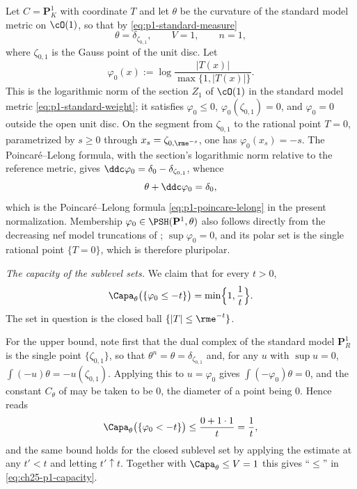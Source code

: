 \begin{example}
\label{ex:ch25-pluripolar-computed}
Let $C=\mathbf P^1_K$ with coordinate $T$ and let $\theta$ be the
curvature of the standard model metric on $\cO(1)$, so that by
\eqref{eq:p1-standard-measure}
\[
 \theta=\delta_{\zeta_{0,1}},\qquad V=1,\qquad n=1,
\]
where $\zeta_{0,1}$ is the Gauss point of the unit disc.  Let
\[
 \varphi_0(x):=\log\frac{|T(x)|}{\max\{1,|T(x)|\}} .
\]
This is the logarithmic norm of the section $Z_1$ of $\cO(1)$ in the standard model
metric \eqref{eq:p1-standard-weight}; it satisfies $\varphi_0\leq0$,
$\varphi_0(\zeta_{0,1})=0$, and $\varphi_0=0$ outside the open unit disc.
On the segment from $\zeta_{0,1}$ to the rational point $T=0$,
parametrized by $s\geq0$ through $x_s=\zeta_{0,\rme^{-s}}$, one has
$\varphi_0(x_s)=-s$.  The Poincar\'e--Lelong formula, with the section's
logarithmic norm relative to the reference metric, gives
$\ddc\varphi_0=\delta_0-\delta_{\zeta_{0,1}}$, whence
\[
 \theta+\ddc\varphi_0=\delta_0,
\]
which is the Poincar\'e--Lelong formula \eqref{eq:p1-poincare-lelong} in the
present normalization.  Membership
$\varphi_0\in\PSH(\mathbf P^1,\theta)$ also follows directly from the
decreasing nef model truncations of ;
$\sup\varphi_0=0$, and its polar set is the single rational point
$\{T=0\}$, which is therefore pluripolar.

\emph{The capacity of the sublevel sets.}  We claim that for every
$t>0$,
\begin{equation}
\label{eq:ch25-p1-capacity}
 \Capa_\theta\bigl(\{\varphi_0\leq-t\}\bigr)=\min\Bigl\{1,\frac1t\Bigr\} .
\end{equation}
The set in question is the closed ball $\{|T|\leq\rme^{-t}\}$.

For the upper bound, note first that the dual complex of the standard model
$\mathbf P^1_R$ is the single point $\{\zeta_{0,1}\}$, so that
$\theta^n=\theta=\delta_{\zeta_{0,1}}$ and, for any $u$ with
$\sup u=0$, $\int(-u)\theta=-u(\zeta_{0,1})$.  Applying this to
$u=\varphi_0$ gives $\int(-\varphi_0)\theta=0$, and the constant
$C_\theta$ of  may be taken to be $0$,
the diameter of a point being $0$.  Hence
 reads
\[
 \Capa_\theta\bigl(\{\varphi_0<-t\}\bigr)\leq\frac{0+1\cdot1}{t}
 =\frac1t ,
\]
and the same bound holds for the closed sublevel set by applying the estimate
at any $t'<t$ and letting $t'\uparrow t$.  Together with
$\Capa_\theta\leq V=1$ this gives ``$\leq$'' in
\eqref{eq:ch25-p1-capacity}.


\end{example}
